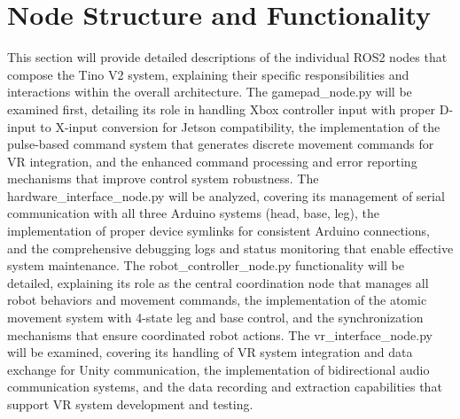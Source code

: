 \section{Node Structure and Functionality}
This section will provide detailed descriptions of the individual ROS2 nodes that compose the Tino V2 system, explaining their specific responsibilities and interactions within the overall architecture. The gamepad\_node.py will be examined first, detailing its role in handling Xbox controller input with proper D-input to X-input conversion for Jetson compatibility, the implementation of the pulse-based command system that generates discrete movement commands for VR integration, and the enhanced command processing and error reporting mechanisms that improve control system robustness. The hardware\_interface\_node.py will be analyzed, covering its management of serial communication with all three Arduino systems (head, base, leg), the implementation of proper device symlinks for consistent Arduino connections, and the comprehensive debugging logs and status monitoring that enable effective system maintenance. The robot\_controller\_node.py functionality will be detailed, explaining its role as the central coordination node that manages all robot behaviors and movement commands, the implementation of the atomic movement system with 4-state leg and base control, and the synchronization mechanisms that ensure coordinated robot actions. The vr\_interface\_node.py will be examined, covering its handling of VR system integration and data exchange for Unity communication, the implementation of bidirectional audio communication systems, and the data recording and extraction capabilities that support VR system development and testing.

